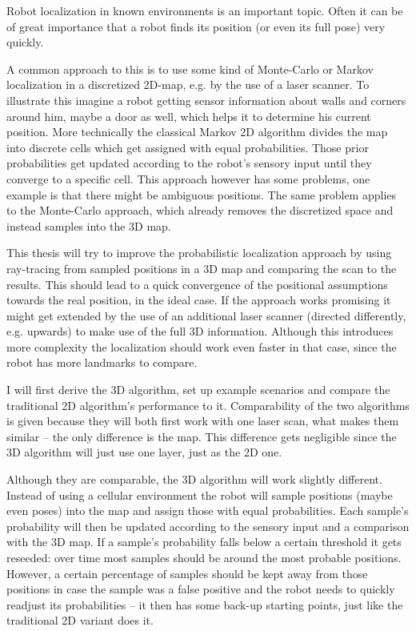 \documentclass[Thesis.tex]{subfiles}
\begin{document}
Robot localization in known environments is an important topic. Often it can be of great importance that a robot finds its position (or even its full pose) very quickly.

A common approach to this is to use some kind of Monte-Carlo or Markov localization in a discretized 2D-map, e.g. by the use of a laser scanner. To illustrate this imagine a robot getting sensor information about walls and corners around him, maybe a door as well, which helps it to determine his current position. More technically the classical Markov 2D algorithm divides the map into discrete cells which get assigned with equal probabilities. Those prior probabilities get updated according to the robot's sensory input until they converge to a specific cell. This approach however has some problems, one example is that there might be ambiguous positions. The same problem applies to the Monte-Carlo approach, which already removes the discretized space and instead samples into the 3D map.

\bigskip

This thesis will try to improve the probabilistic localization approach by using ray-tracing from sampled positions in a 3D map and comparing the scan to the results. This should lead to a quick convergence of the positional assumptions towards the real position, in the ideal case. If the approach works promising it might get extended by the use of an additional laser scanner (directed differently, e.g. upwards) to make use of the full 3D information. Although this introduces more complexity the localization should work even faster in that case, since the robot has more landmarks to compare.

I will first derive the 3D algorithm, set up example scenarios and compare the traditional 2D algorithm's performance to it. Comparability of the two algorithms is given because they will both first work with one laser scan, what makes them similar -- the only difference is the map. This difference gets negligible since the 3D algorithm will just use one layer, just as the 2D one.

\bigskip

Although they are comparable, the 3D algorithm will work slightly different. Instead of using a cellular environment the robot will sample positions (maybe even poses) into the map and assign those with equal probabilities. Each sample's probability will then be updated according to the sensory input and a comparison with the 3D map. If a sample's probability falls below a certain threshold it gets reseeded: over time most samples should be around the most probable positions. However, a certain percentage of samples should be kept away from those positions in case the sample was a false positive and the robot needs to quickly readjust its probabilities -- it then has some back-up starting points, just like the traditional 2D variant does it.
\end{document}
